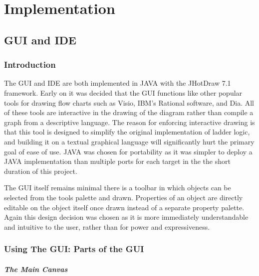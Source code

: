 \section{Implementation}
\subsection{GUI and IDE}
\label{IDE}
\subsubsection{Introduction}

The GUI and IDE are both implemented in JAVA with the JHotDraw 7.1 framework. 
Early on it was decided that the GUI functions like other popular tools for 
drawing flow charts such as Visio, IBM's Rational software, and Dia. 
All of these tools are interactive in the drawing of the diagram rather than 
compile a graph from a descriptive language. The reason for enforcing interactive 
drawing is that this tool is designed to simplify the original implementation 
of ladder logic, and building it on a textual graphical language will
significantly hurt the primary goal of ease of use.
JAVA was chosen for portability as it was simpler to deploy a JAVA implementation 
than multiple ports for each target in the the short duration of this project.

The GUI itself remains minimal there is a toolbar in which objects can be 
selected from the tools palette and drawn. Properties of an object are 
directly editable on the object itself once drawn instead of a separate 
property palette. Again this design decision was chosen as it is more 
immediately understandable and intuitive to the user, rather than for 
power and expressiveness.

\subsubsection{Using The GUI: Parts of the GUI}

\subparagraph{The Main Canvas}

